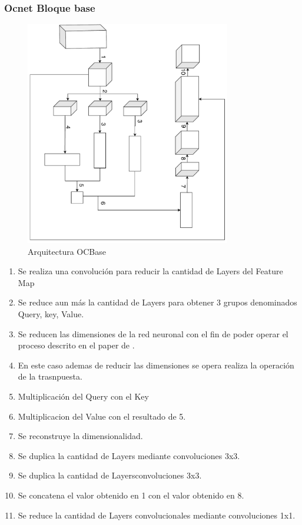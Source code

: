 \subsubsection{Ocnet Bloque base}
\begin{figure}[H]
    \centering
    \includegraphics[width=0.8\textwidth]{images/blocks/decoder.pdf}
    \caption{Arquitectura OCBase}
    \label{fig:my_label}
\end{figure}
\begin{enumerate}
    \item Se realiza una convolución para reducir la cantidad de \gls{Layer}s del \gls{Feature Map}
    \item Se reduce aun más la cantidad de \gls{Layer}s para obtener 3 grupos denominados Query, key, Value.
    \item Se reducen las dimensiones de la red neuronal con el fin de poder operar el proceso descrito en el paper de \cite{yuan2018ocnet}.
    \item En este caso ademas de reducir las dimensiones se opera realiza la operación de la trasnpuesta.
    \item Multiplicación del Query con el Key
    \item Multiplicacion del Value con el resultado de 5. 
    \item Se reconstruye la dimensionalidad. 
    \item Se duplica la cantidad de Layers mediante convoluciones 3x3.
    \item  Se duplica la cantidad de Layersconvoluciones 3x3.
    \item Se concatena el valor obtenido en 1 con el valor obtenido en 8.
    \item Se reduce la cantidad de \gls{Layer}s convolucionales mediante convoluciones 1x1.
\end{enumerate}{}

